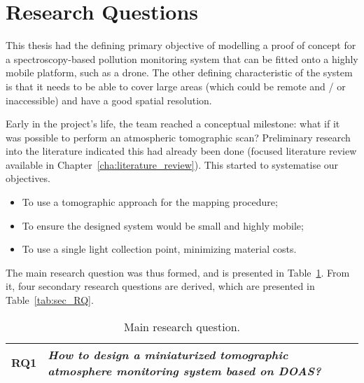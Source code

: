 
\section{Research Questions}%
\label{sec:intro_research_questions}

This thesis had the defining primary objective of modelling a proof of
concept for a spectroscopy-based pollution monitoring system that can be
fitted onto a highly mobile platform, such as a drone. The other
defining characteristic of the system is that it needs to be able to
cover large areas (which could be remote and / or inaccessible) and have
a good spatial resolution.

Early in the project's life, the team reached a conceptual milestone:
what if it was possible to perform an atmospheric tomographic scan?
Preliminary research into the literature indicated this had already been
done (focused literature review available in
Chapter~\ref{cha:literature_review}). This started to systematise our
objectives.

\begin{itemize}
    \item To use a tomographic approach for the mapping procedure;
    \item To ensure the designed system would be small and highly
        mobile;
    \item To use a single light collection point, minimizing material
        costs.
\end{itemize}

The main research question was thus formed, and is presented in
Table~\ref{tab:RQ1}. From it, four secondary research questions are
derived, which are presented in Table~\ref{tab:sec_RQ}.

\begin{table}[htpb]
    \centering
    \caption{Main research question.}
    \label{tab:RQ1}
    \begin{tabularx}{0.8\textwidth}{cX}
        \toprule
        \textbf{RQ1}&\emph{ How to design a miniaturized tomographic
        atmosphere monitoring system based on \gls{DOAS}? }\\
        \bottomrule
    \end{tabularx}
\end{table}

